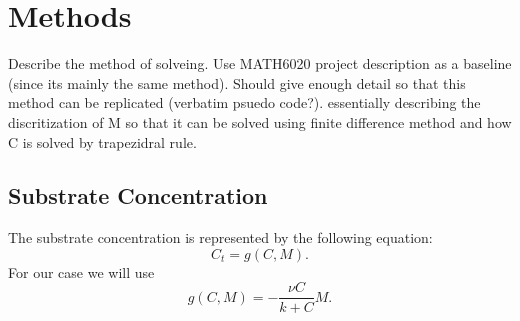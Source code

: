 \section{Methods}

Describe the method of solveing. Use MATH6020 project description as a baseline (since its mainly the same method).
Should give enough detail so that this method can be replicated (verbatim psuedo code?).
essentially describing the discritization of M so that it can be solved using finite difference method and how C is solved by trapezidral rule.


\subsection{Substrate Concentration}
  The substrate concentration is represented by the following equation:
  \begin{equation} \label{eq:c=g}
    C_t = g(C,M).
  \end{equation}
  For our case we will use
  \begin{equation} \label{func:g}
    g(C,M) = -\frac{\nu C}{k + C} M.
  \end{equation}
  

